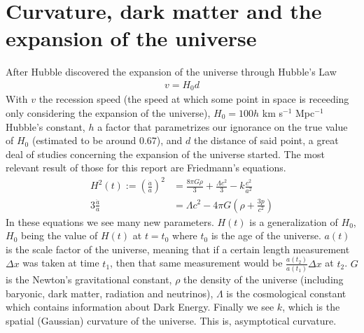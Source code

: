 \section{Curvature, dark matter and the expansion of the universe}
After Hubble discovered the expansion of the universe through Hubble's Law\cite{Hubble1929}
\begin{align}
	v = H_0 d
	\label{eq:ley-hubble}
\end{align}
With $v$ the recession speed (the speed at which some point in space is receeding only considering the expansion of the universe), $H_0=100h$ km s$^{-1}$ Mpc$^{-1}$ Hubble's constant, $h$ a factor that parametrizes our ignorance on the true value of $H_0$ (estimated to be around $0.67$), and $d$ the distance of said point, a great deal of studies concerning the expansion of the universe started. The most relevant result of those for this report are Friedmann's equations. \\
\begin{align}
	H^2(t) := \left(\frac{\dot a}{a}\right)^2 &=  \frac{8\pi G \rho}{3} +\frac{\Lambda c^2}{3} - k \frac{c^2}{a^2}
	\label{eq:1a-friedmann}\\
	3 \frac{\ddot a}{a} &= \Lambda c^2 - 4\pi G \left( \rho + \frac{3p}{c^2} \right) 
	\label{eq:2a-friedmann}
\end{align}
In these equations we see many new parameters. $H(t)$ is a generalization of $H_0$, $H_0$ being the value of $H(t)$ at $t=t_0$ where $t_0$ is the age of the universe. $a(t)$ is the scale factor of the universe, meaning that if a certain length measurement $\Delta x$ was taken at time $t_1$, then that same measurement would be $\frac{a(t_2)}{a(t_1)}\Delta x$ at $t_2$. $G$ is the Newton's gravitational constant, $\rho$ the density of the universe (including baryonic, dark matter, radiation and neutrinos), $\Lambda$ is the cosmological constant which contains information about Dark Energy. Finally we see $k$, which is the spatial (Gaussian) curvature of the universe. This is, asymptotical curvature. \\

